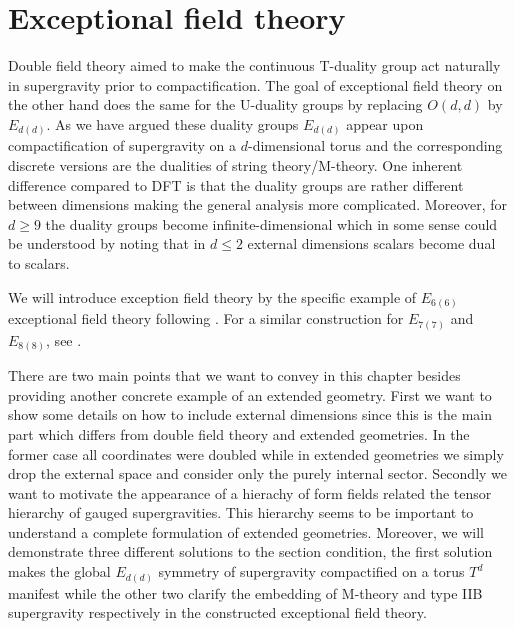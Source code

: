 \chapter{Exceptional field theory\label{chap:ExceptionalFieldTheory}}

Double field theory aimed to make the continuous T-duality group act naturally in supergravity prior to compactification. The goal of exceptional field theory on the other hand does the same for the U-duality groups by replacing $O(d,d)$ by $E_{d(d)}$. As we have argued these duality groups $E_{d(d)}$ appear upon compactification of supergravity on a $d$-dimensional torus and the corresponding discrete versions are the dualities of string theory/M-theory. One inherent difference compared to DFT is that the duality groups are rather different between dimensions making the general analysis more complicated. Moreover, for $d\geq 9$ the duality groups become infinite-dimensional which in some sense could be understood by noting that in $d\leq 2$ external dimensions scalars become dual to scalars. %

We will introduce exception field theory by the specific example of $E_{6(6)}$ exceptional field theory following \cite{E62014}. For a similar construction for $E_{7(7)}$ and $E_{8(8)}$, see \cite{E72014,E82014}. 

There are two main points that we want to convey in this chapter besides providing another concrete example of an extended geometry. First we want to show some details on how to include external dimensions since this is the main part which differs from double field theory and extended geometries. In the former case all coordinates were doubled while in extended geometries we simply drop the external space and consider only the purely internal sector. Secondly we want to motivate the appearance of a hierachy of form fields related the tensor hierarchy of gauged supergravities. This hierarchy seems to be important to understand a complete formulation of extended geometries. Moreover, we will demonstrate three different solutions to the section condition, the first solution makes the global $E_{d(d)}$ symmetry of supergravity compactified on a torus $T^d$ manifest while the other two clarify the embedding of M-theory and type IIB supergravity respectively in the constructed exceptional field theory. 

